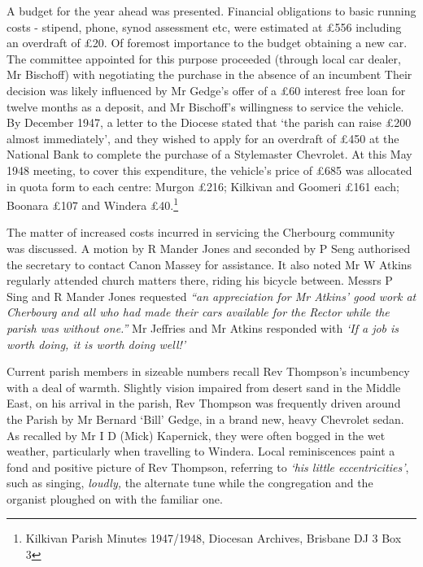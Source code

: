 A budget for the year ahead was presented. Financial obligations to basic running costs - stipend, phone, synod assessment etc, were estimated at \pounds556 including an overdraft of \pounds20. Of foremost importance to the budget obtaining a new car. The committee appointed for this purpose proceeded (through local car dealer, Mr Bischoff) with negotiating the purchase in the absence of an incumbent Their decision was likely influenced by Mr Gedge's offer of a \pounds60 interest free loan for twelve months as a deposit, and Mr Bischoff's willingness to service the vehicle. By December 1947, a letter to the Diocese stated that `the parish can raise \pounds200 almost immediately', and they wished to apply for an overdraft of \pounds450 at the National Bank to complete the purchase of a Stylemaster Chevrolet. At this May 1948 meeting, to cover this expenditure, the vehicle's price of \pounds685 was allocated in quota form to each centre: Murgon \pounds216; Kilkivan and Goomeri \pounds161 each; Boonara \pounds107 and Windera \pounds40.\footnote{Kilkivan Parish Minutes 1947/1948, Diocesan Archives, Brisbane DJ 3 Box 3}


The matter of increased costs incurred in servicing the Cherbourg community was discussed. A motion by R Mander Jones and seconded by P Seng authorised the secretary to contact Canon Massey for assistance. It also noted Mr W Atkins regularly attended church matters there, riding his bicycle between. Messrs P Sing and R Mander Jones requested \emph{``an appreciation for Mr Atkins' good work at Cherbourg and all who had made their cars available for the Rector while the parish was without one.''} Mr Jeffries and Mr Atkins responded with \emph{`If a job is worth doing, it is worth doing well!'}



Current parish members in sizeable numbers recall Rev Thompson's incumbency with a deal of warmth. Slightly vision impaired from desert sand in the Middle East, on his arrival in the parish, Rev Thompson was frequently driven around the Parish by Mr Bernard `Bill' Gedge, in a brand new, heavy Chevrolet sedan. As recalled by Mr I D (Mick) Kapernick, they were often bogged in the wet weather, particularly when travelling to Windera. Local reminiscences paint a fond and positive picture of Rev Thompson, referring to \emph{`his little eccentricities'}, such as singing, \emph{loudly,} the alternate tune while the congregation and the organist ploughed on with the familiar one.



